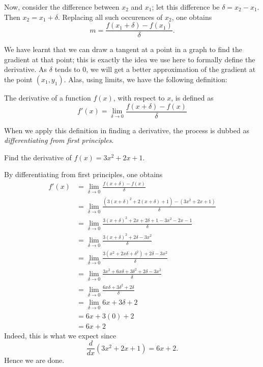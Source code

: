 Now, consider the difference between $x_2$ and $x_1$; let this difference be
$\delta = x_2 - x_1$. Then $x_2 = x_1 + \delta$. Replacing all such occurences of $x_2$, one obtains
\[m = \frac{f(x_1 + \delta) - f(x_1)}{\delta}.\]

We have learnt that we can draw a tangent at a point in a graph to find the gradient at that point; this is exactly
the idea we use here to formally define the derivative. As $\delta$ tends to $0$, we will get a better approximation
of the gradient at the point $(x_1, y_1)$. Alas, using limits, we have the following definition:

\begin{definition}
    The derivative of a function $f(x)$, with respect to $x$, is defined as
    \[f'(x) = \lim_{\delta \to 0} \frac{f(x + \delta) - f(x)}{\delta}\]
\end{definition}

When we apply this definition in finding a derivative, the process is dubbed as \textit{differentiating
from first principles}.

\begin{example}
    Find the derivative of $f(x) = 3x^2 + 2x + 1$.
\end{example}
\begin{solution}
    By differentiating from first principles, one obtains
    \begin{equation*}
        \begin{split}
            f'(x) &= \lim_{\delta \to 0} \frac{f(x + \delta) - f(x)}{\delta} \\
            &= \lim_{\delta \to 0} \frac{(3(x + \delta)^2 + 2(x + \delta) + 1) - (3x^2 + 2x + 1)}{\delta} \\
            &= \lim_{\delta \to 0} \frac{3(x + \delta)^2 + 2x + 2\delta + 1 - 3x^2 - 2x - 1}{\delta} \\
            &= \lim_{\delta \to 0} \frac{3(x + \delta)^2 + 2\delta - 3x^2}{\delta} \\
            &= \lim_{\delta \to 0} \frac{3(x^2 + 2x\delta + \delta^2) + 2\delta - 3x^2}{\delta} \\
            &= \lim_{\delta \to 0} \frac{3x^2 + 6x\delta + 3\delta^2 + 2\delta - 3x^2}{\delta} \\
            &= \lim_{\delta \to 0} \frac{6x\delta + 3\delta^2 + 2\delta}{\delta} \\
            &= \lim_{\delta \to 0} 6x + 3\delta + 2 \\
            &= 6x + 3(0) + 2 \\
            &= 6x + 2
        \end{split}
    \end{equation*}
    Indeed, this is what we expect since \[\frac{d}{dx}(3x^2 + 2x + 1) = 6x + 2.\]
    Hence we are done.
\end{solution}

